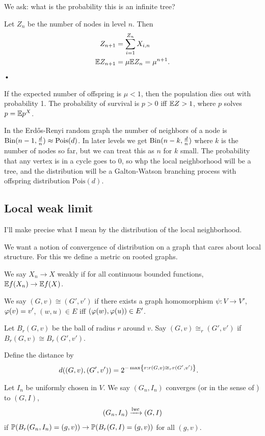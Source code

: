 We ask: what is the probability this is an infinite tree?

Let $Z_n$ be the number of nodes in level $n$. Then
\begin{align}
Z_{n+1} &= \sum_{i=1}^{Z_n} X_{i,n}\\
\mathbb{E} Z_{n+1} &=  \mu \mathbb{E} Z_n = \mu^{n+1}.
\end{align}•

If the expected number of offspring is $\mu<1$, then the population dies out with probability 1. The probability of survival is $p>0$ iff $\mathbb{E} Z>1$, where $p$ solves $p=\mathbb{E} p^X$.

In the Erd\H os-Renyi random graph the number of neighbors of a node is $\text{Bin}(n-1,\frac{d}{n})\approx \text{Pois}(d)$. In later levels we get $\text{Bin}(n-k,\frac{d}{n})$ where $k$ is the number of nodes so far, but we can treat this as $n$ for $k$ small. The probability that any vertex is in a cycle goes to 0, so whp the local neighborhood will be a tree, and the distribution will be a Galton-Watson branching process with offspring distribution $\text{Pois}(d)$.

\subsection{Local weak limit}
I'll make precise what I mean by the distribution of the local neighborhood.

We want a notion of convergence of distribution on a graph that cares about local structure. For this we define a metric on rooted graphs. %

\begin{df}
We say $X_n\to X$ weakly if for all continuous bounded functions, $\mathbb{E} f(X_n)\to \mathbb{E} f(X)$.
\end{df}
\begin{df}
We say $(G,v)\cong (G',v')$ if there exists a graph homomorphism $\psi:V\to V'$, $\varphi(v)=v'$, $(w,u)\in E$ iff $(\varphi(w),\varphi(u))\in E'$. 

Let $B_r(G,v)$ be the ball of radius $r$ around $v$. Say $(G,v)\cong_r (G',v')$ if $B_r(G,v)\cong B_r(G',v')$. 

Define the distance by
\begin{align}
d((G,v),(G',v')) & = 2^{-\max\left\{{r}:{r(G,v)\cong_r r(G',v')}\right\}}.
\end{align}

Let $I_n$ be uniformly chosen in $V$. We say $(G_n,I_n)$ converges  (or in the sense of ) to $(G,I)$,
\begin{align}
(G_n,I_n) \xrightarrow{\text{lwc}} (G,I)
\end{align}
if $\mathbb{P}(B_r(G_n,I_n)=(g,v))\to \mathbb{P}(B_r(G,I)=(g,v))$ for all $(g,v)$.
\end{df}

